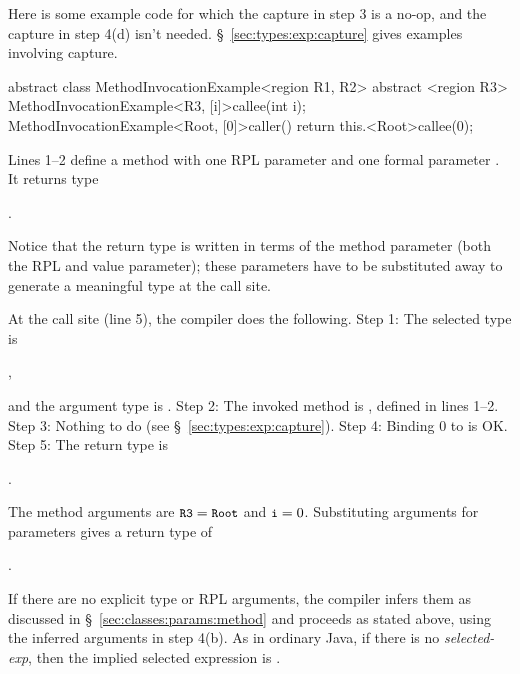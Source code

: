 Here is some example code for which the capture in step 3 is a no-op,
and the capture in step 4(d) isn't needed.
\S~\ref{sec:types:exp:capture} gives examples involving capture.
%
\begin{numbereddpjlisting}
abstract class MethodInvocationExample<region R1, R2> {
    abstract <region R3>
        MethodInvocationExample<R3, [i]>callee(int i);
    MethodInvocationExample<Root, [0]>caller() {
        return this.<Root>callee(0);
    }
}
\end{numbereddpjlisting}
%
Lines 1--2 define a method  with one RPL parameter
 and one formal parameter .  It returns type
%
\begin{description}
\item {}.  
\end{description}
%
Notice that the return type is written in terms of the method
parameter (both the RPL and value parameter); these parameters have to
be substituted away to generate a meaningful type at the call site.

At the call site (line 5), the compiler does the following.  Step 1:
The selected type is
%
\begin{description}
\item {},
\end{description}
%
and the argument type is .  Step 2: The invoked method is
, defined in lines 1--2.  Step 3: Nothing to do (see
\S~\ref{sec:types:exp:capture}).  Step 4: Binding 0 to  is
OK.  Step 5: The return type is
%
\begin{description}
\item {}.
\end{description}
%
The method arguments are $\mbox{\small{\texttt{R3}}}=\mbox{\small{\texttt{Root}}}$ and $\mbox{\small{\texttt{i}}}=0$.
Substituting arguments for parameters gives a return type of
%
\begin{description}
\item {}.
\end{description}

 If there are no explicit
type or RPL arguments, the compiler infers them as discussed in
\S~\ref{sec:classes:params:method} and proceeds as stated above, using
the inferred arguments in step 4(b).  As in ordinary Java, if there is
no \emph{selected-exp}, then the implied selected expression is
.


